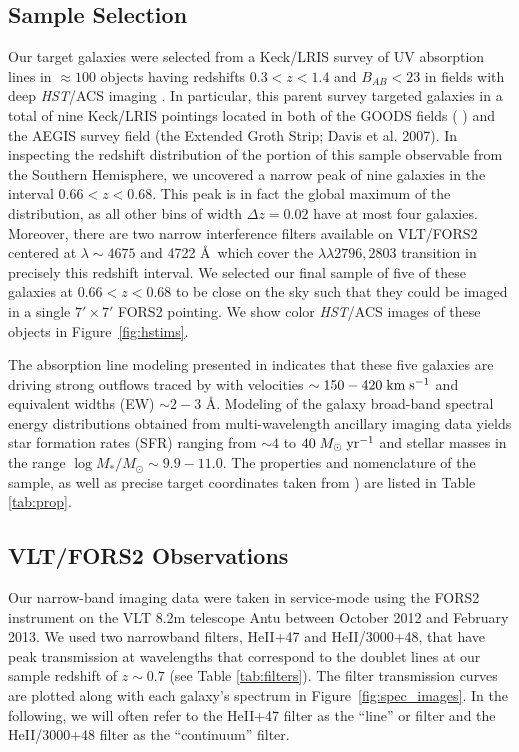 \documentclass[twocolumn]{aastex61}
\def \mkms {{\rm \; km\;s^{-1}}}
\def \msunperyr {{\; M_{\odot}\rm \;yr^{-1}}}
\begin{document}
\subsection{Sample Selection}
Our target galaxies were selected from a Keck/LRIS survey of UV absorption lines in $\approx 100$ objects having redshifts $0.3< z < 1.4$ and $B_{AB}< 23$ in fields with deep \emph{HST}/ACS imaging \citep{Rubin_2014}.  In particular, this parent survey targeted galaxies in a total of nine Keck/LRIS pointings located in both of the GOODS fields (\citeauthor{Giavalisco2004} \citeyear{Giavalisco2004}) and the AEGIS survey field (the Extended Groth Strip; Davis et al. 2007)\nocite{Davis2007}.  In inspecting the redshift distribution of the portion of this sample observable from the Southern Hemisphere, we uncovered a narrow peak of nine galaxies in the interval $0.66 < z < 0.68$.  This peak is in fact the global maximum of the distribution, as all other bins of width $\Delta z = 0.02$ have at most four galaxies.  Moreover, there are two narrow interference filters available on VLT/FORS2 centered at $\lambda \sim 4675$ and 4722 \AA\ which cover the  $\lambda \lambda 2796, 2803$ transition in precisely this redshift interval.  We selected our final sample of five of these galaxies at $0.66 < z < 0.68$ to be close on the sky such that they could be imaged in a single $7' \times 7' $ FORS2 pointing.  
We show color {\it HST}/ACS images of these objects in Figure~\ref{fig:hstims}.

The absorption line modeling presented in \cite{Rubin_2014} indicates that these five galaxies are driving strong outflows traced by   with velocities $\sim150-420\mkms$ and equivalent widths (EW) $\sim 2-3$ \AA.  Modeling of the galaxy broad-band spectral energy distributions obtained from multi-wavelength ancillary imaging data yields star formation rates (SFR) ranging from $\sim4$ to $40\msunperyr$ and stellar masses in the range $\log M_*/M_{\odot}\sim 9.9-11.0$. The properties and nomenclature of the sample, as well as precise target coordinates taken from \cite{Rubin_2014} ) are listed in Table \ref{tab:prop}. 


\subsection{VLT/FORS2 Observations}
Our narrow-band imaging data were taken in service-mode using the FORS2 instrument on the VLT 8.2m telescope Antu between October 2012 and February 2013. 
We used two narrowband filters, HeII+47 and HeII/3000+48, that have peak transmission at wavelengths that correspond to the  doublet lines at our sample redshift of $z\sim0.7$ (see Table \ref{tab:filters}). The filter transmission curves are plotted along with each galaxy's spectrum in Figure~\ref{fig:spec_images}.
In the following, we will often refer to the HeII+47 filter as the ``line'' or  filter and the HeII/3000+48 filter as the ``continuum'' filter.
\end{document}
